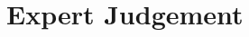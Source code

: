 \documentclass[11pt]{amsart}
\begin{document}
\section{Expert Judgement}




%

%
%




\end{document}

